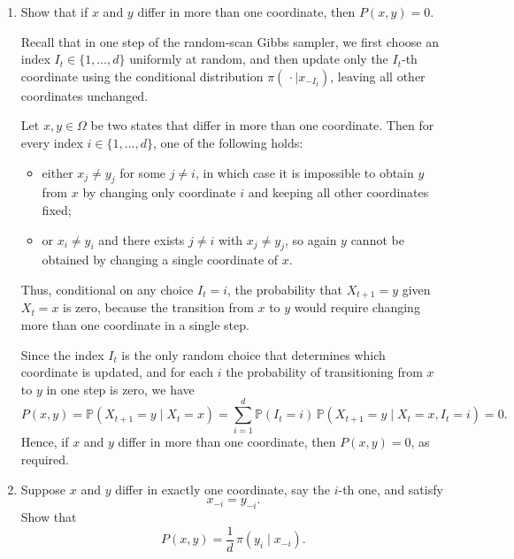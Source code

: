 \documentclass[answers,12pt,addpoints]{exam}
\begin{document}
\begin{enumerate}
    \item Show that if $x$ and $y$ differ in more than one coordinate, then $P(x,y) = 0$.
    \begin{solution}
        Recall that in one step of the random-scan Gibbs sampler, we first choose an index
$I_t \in \{1,\dots,d\}$ uniformly at random, and then update only the $I_t$-th
coordinate using the conditional distribution $\pi(\,\cdot \mid x_{-I_t})$,
leaving all other coordinates unchanged.

Let $x,y \in \Omega$ be two states that differ in more than one coordinate.
Then for every index $i \in \{1,\dots,d\}$, one of the following holds:
\begin{itemize}
    \item either $x_j \neq y_j$ for some $j \neq i$, in which case it is impossible
    to obtain $y$ from $x$ by changing only coordinate $i$ and keeping all other
    coordinates fixed;
    \item or $x_i \neq y_i$ and there exists $j \neq i$ with $x_j \neq y_j$, so again
    $y$ cannot be obtained by changing a single coordinate of $x$.
\end{itemize}
Thus, conditional on any choice $I_t = i$, the probability that $X_{t+1} = y$
given $X_t = x$ is zero, because the transition from $x$ to $y$ would require
changing more than one coordinate in a single step.

Since the index $I_t$ is the only random choice that determines which coordinate
is updated, and for each $i$ the probability of transitioning from $x$ to $y$ in
one step is zero, we have
\[
P(x,y) = \mathbb{P}(X_{t+1} = y \mid X_t = x)
       = \sum_{i=1}^d \mathbb{P}(I_t = i)\,
         \mathbb{P}(X_{t+1} = y \mid X_t = x, I_t = i)
       = 0.
\]
Hence, if $x$ and $y$ differ in more than one coordinate, then $P(x,y) = 0$, as
required.
    \end{solution}
    \item Suppose $x$ and $y$ differ in exactly one coordinate, say the $i$-th one, and satisfy
    \[
    x_{-i} = y_{-i}.
    \]
    Show that
    \[
    P(x,y) = \frac{1}{d}\,\pi(y_i \mid x_{-i}).
    \]


\end{enumerate}
\end{document}
